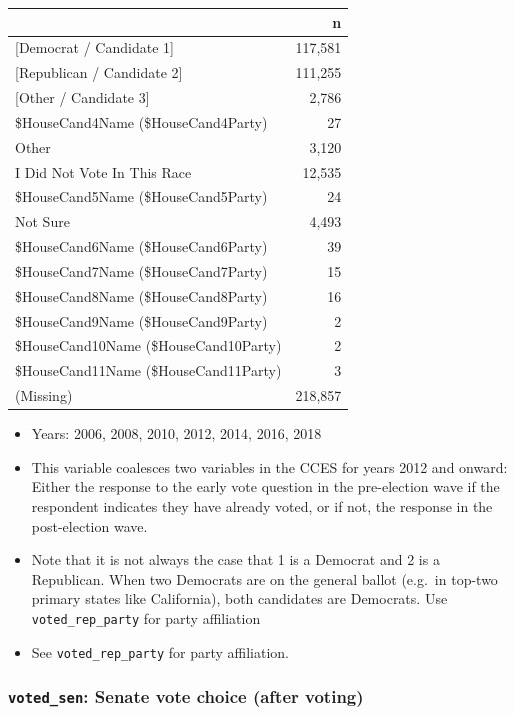 \documentclass[10pt,article,oneside]{memoir}
\theoremstyle{definition}
\begin{document}
\begin{table}[H]
\centering
\begin{tabular}{lr}
\toprule
 & n\\
\midrule
{[Democrat / Candidate 1]} & 117,581\\
{[Republican / Candidate 2]} & 111,255\\
{[Other / Candidate 3]} & 2,786\\
\$HouseCand4Name (\$HouseCand4Party) & 27\\
Other & 3,120\\
I Did Not Vote In This Race & 12,535\\
\$HouseCand5Name (\$HouseCand5Party) & 24\\
Not Sure & 4,493\\
\$HouseCand6Name (\$HouseCand6Party) & 39\\
\$HouseCand7Name (\$HouseCand7Party) & 15\\
\$HouseCand8Name (\$HouseCand8Party) & 16\\
\$HouseCand9Name (\$HouseCand9Party) & 2\\
\$HouseCand10Name (\$HouseCand10Party) & 2\\
\$HouseCand11Name (\$HouseCand11Party) & 3\\
(Missing) & 218,857\\
\bottomrule
\end{tabular}
\end{table}

\begin{itemize}
\tightlist
\item
  Years: 2006, 2008, 2010, 2012, 2014, 2016, 2018
\item
  This variable coalesces two variables in the CCES for years 2012 and
  onward: Either the response to the early vote question in the
  pre-election wave if the respondent indicates they have already voted,
  or if not, the response in the post-election wave.
\item
  Note that it is not always the case that 1 is a Democrat and 2 is a
  Republican. When two Democrats are on the general ballot (e.g.~in
  top-two primary states like California), both candidates are
  Democrats. Use \texttt{voted\_rep\_party} for party affiliation
\item
  See \texttt{voted\_rep\_party} for party affiliation.
\end{itemize}

\hypertarget{voted_sen-senate-vote-choice-after-voting}{%
\subsubsection{\texorpdfstring{\texttt{voted\_sen}: Senate vote choice
(after
voting)}{voted\_sen: Senate vote choice (after voting)}}\label{voted_sen-senate-vote-choice-after-voting}}
\end{document}
